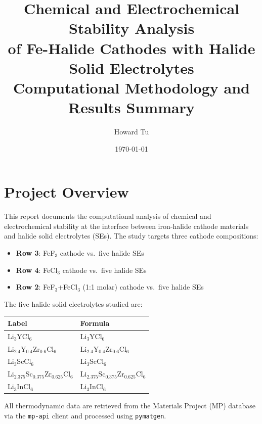 \documentclass[11pt,letterpaper]{article}
\title{Chemical and Electrochemical Stability Analysis\\
       of Fe-Halide Cathodes with Halide Solid Electrolytes\\[0.5em]
       \large Computational Methodology and Results Summary}
\author{Howard Tu}
\date{\today}
\begin{document}
\maketitle
\tableofcontents
\newpage

\section{Project Overview}

This report documents the computational analysis of chemical and electrochemical
stability at the interface between iron-halide cathode materials and halide solid
electrolytes (SEs). The study targets three cathode compositions:

\begin{itemize}
  \item \textbf{Row 3}: FeF$_3$ cathode vs.\ five halide SEs
  \item \textbf{Row 4}: FeCl$_3$ cathode vs.\ five halide SEs
  \item \textbf{Row 2}: FeF$_3$+FeCl$_3$ (1:1 molar) cathode vs.\ five halide SEs
\end{itemize}

The five halide solid electrolytes studied are:

\begin{center}
\begin{tabular}{ll}
\toprule
Label & Formula \\
\midrule
Li$_3$YCl$_6$                                   & Li$_3$YCl$_6$ \\
Li$_{2.4}$Y$_{0.4}$Zr$_{0.6}$Cl$_6$               & Li$_{2.4}$Y$_{0.4}$Zr$_{0.6}$Cl$_6$ \\
Li$_3$ScCl$_6$                                  & Li$_3$ScCl$_6$ \\
Li$_{2.375}$Sc$_{0.375}$Zr$_{0.625}$Cl$_6$        & Li$_{2.375}$Sc$_{0.375}$Zr$_{0.625}$Cl$_6$ \\
Li$_3$InCl$_6$                                  & Li$_3$InCl$_6$ \\
\bottomrule
\end{tabular}
\end{center}

All thermodynamic data are retrieved from the Materials Project (MP) database
via the \texttt{mp-api} client and processed using \texttt{pymatgen}.

\end{document}
